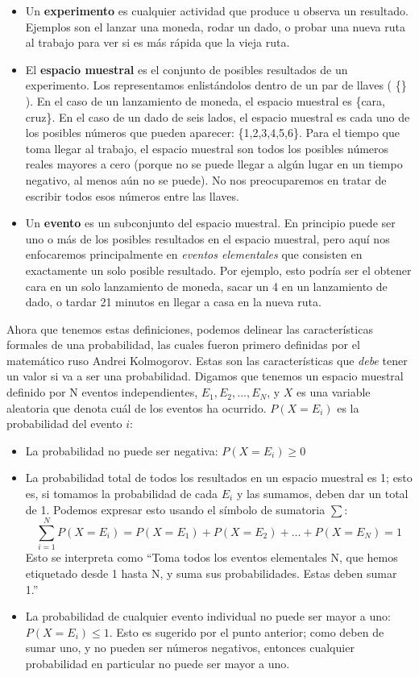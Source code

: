 \documentclass[
  12pt,
]{book}
\providecommand{\tightlist}{%
  \setlength{\itemsep}{0pt}\setlength{\parskip}{0pt}}
\begin{document}
\begin{itemize}
\tightlist
\item
  Un \textbf{experimento} es cualquier actividad que produce u observa un resultado. Ejemplos son el lanzar una moneda, rodar un dado, o probar una nueva ruta al trabajo para ver si es más rápida que la vieja ruta.
\item
  El \textbf{espacio muestral} es el conjunto de posibles resultados de un experimento. Los representamos enlistándolos dentro de un par de llaves ( \{\} ). En el caso de un lanzamiento de moneda, el espacio muestral es \{cara, cruz\}. En el caso de un dado de seis lados, el espacio muestral es cada uno de los posibles números que pueden aparecer: \{1,2,3,4,5,6\}. Para el tiempo que toma llegar al trabajo, el espacio muestral son todos los posibles números reales mayores a cero (porque no se puede llegar a algún lugar en un tiempo negativo, al menos aún no se puede). No nos preocuparemos en tratar de escribir todos esos números entre las llaves.
\item
  Un \textbf{evento} es un subconjunto del espacio muestral. En principio puede ser uno o más de los posibles resultados en el espacio muestral, pero aquí nos enfocaremos principalmente en \emph{eventos elementales} que consisten en exactamente un solo posible resultado. Por ejemplo, esto podría ser el obtener cara en un solo lanzamiento de moneda, sacar un 4 en un lanzamiento de dado, o tardar 21 minutos en llegar a casa en la nueva ruta.
\end{itemize}

Ahora que tenemos estas definiciones, podemos delinear las características formales de una probabilidad, las cuales fueron primero definidas por el matemático ruso Andrei Kolmogorov. Estas son las características que \emph{debe} tener un valor si va a ser una probabilidad. Digamos que tenemos un espacio muestral definido por N eventos independientes, \({E_1, E_2, ... , E_N}\), y \(X\) es una variable aleatoria que denota cuál de los eventos ha ocurrido. \(P(X=E_i)\) es la probabilidad del evento \(i\):

\begin{itemize}
\tightlist
\item
  La probabilidad no puede ser negativa: \(P(X=E_i) \ge 0\)
\item
  La probabilidad total de todos los resultados en un espacio muestral es 1; esto es, si tomamos la probabilidad de cada \(E_i\) y las sumamos, deben dar un total de 1. Podemos expresar esto usando el símbolo de sumatoria \(\sum\):
  \[
  \sum_{i=1}^N{P(X=E_i)} = P(X=E_1) + P(X=E_2) + ... + P(X=E_N) = 1
  \]
  Esto se interpreta como ``Toma todos los eventos elementales N, que hemos etiquetado desde 1 hasta N, y suma sus probabilidades. Estas deben sumar 1.''
\item
  La probabilidad de cualquier evento individual no puede ser mayor a uno: \(P(X=E_i)\le 1\). Esto es sugerido por el punto anterior; como deben de sumar uno, y no pueden ser números negativos, entonces cualquier probabilidad en particular no puede ser mayor a uno.
\end{itemize}
\end{document}

